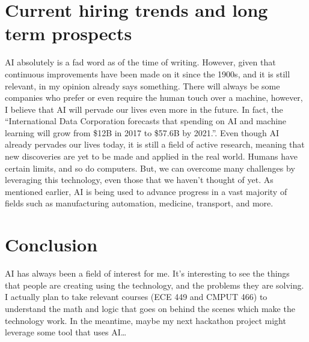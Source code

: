 \documentclass[letterpaper,12pt]{article}
\begin{document}
\section{Current hiring trends and long term prospects}

AI absolutely is a fad word as of the time of writing. However, given that continuous improvements
have been made on it since the 1900s, and it is still relevant, in my opinion already says something.
There will always be some companies who prefer or even require the human touch
over a machine, however, I believe that AI will pervade our lives even more in the future.
In fact, the 
``International Data Corporation forecasts that spending on AI and machine learning will grow from \$12B in 2017 to \$57.6B by 2021.''.
\cite{forbesprojected}
Even though AI already pervades our lives today, 
it is still a field of active research\cite{uofaAI}, meaning that new
discoveries are yet to be made and applied in the real world.
Humans have certain limits, and so do computers. But, we can overcome many challenges by leveraging this technology,
even those that we haven't thought of yet. 
As mentioned earlier,
AI is being used to advance progress in a vast majority of fields
such as manufacturing automation, medicine, transport, and more.

\section{Conclusion}

AI has always been a field of interest for me.
It's interesting to see the things that people are creating
using the technology, and the problems they are solving.
I actually plan to take relevant courses (ECE 449 and CMPUT 466)
to understand the math and logic that goes on behind the scenes
which make the technology work. In the meantime, maybe my next
hackathon project might leverage some tool that uses AI\dots


\singlespacing
\nocite{*}
\printbibliography
% 
% 
\end{document}
